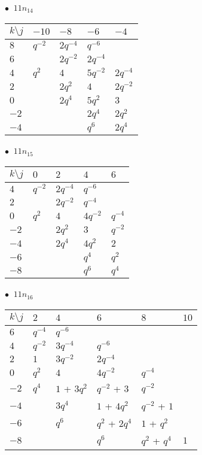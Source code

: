 %
\begin{minipage}{\linewidth}
$\bullet\ $ $11n_{14}$ \vspace{0.5em} \\
\begin{tabular}{l|llll}
$k \setminus j$ & $-10$ & $-8$ & $-6$ & $-4$ \\
\hline
$8$ & $q^{-2}$ & $2q^{-4}$ & $q^{-6}$ &  \\
$6$ &  & $2q^{-2}$ & $2q^{-4}$ &  \\
$4$ & $q^{2}$ & $4$ & $5q^{-2}$ & $2q^{-4}$ \\
$2$ &  & $2q^{2}$ & $4$ & $2q^{-2}$ \\
$0$ &  & $2q^{4}$ & $5q^{2}$ & $3$ \\
$-2$ &  &  & $2q^{4}$ & $2q^{2}$ \\
$-4$ &  &  & $q^{6}$ & $2q^{4}$ \\
\end{tabular}
\vspace{2em}
\end{minipage}
%
\begin{minipage}{\linewidth}
$\bullet\ $ $11n_{15}$ \vspace{0.5em} \\
\begin{tabular}{l|llll}
$k \setminus j$ & $0$ & $2$ & $4$ & $6$ \\
\hline
$4$ & $q^{-2}$ & $2q^{-4}$ & $q^{-6}$ &  \\
$2$ &  & $2q^{-2}$ & $q^{-4}$ &  \\
$0$ & $q^{2}$ & $4$ & $4q^{-2}$ & $q^{-4}$ \\
$-2$ &  & $2q^{2}$ & $3$ & $q^{-2}$ \\
$-4$ &  & $2q^{4}$ & $4q^{2}$ & $2$ \\
$-6$ &  &  & $q^{4}$ & $q^{2}$ \\
$-8$ &  &  & $q^{6}$ & $q^{4}$ \\
\end{tabular}
\vspace{2em}
\end{minipage}
%
\begin{minipage}{\linewidth}
$\bullet\ $ $11n_{16}$ \vspace{0.5em} \\
\begin{tabular}{l|lllll}
$k \setminus j$ & $2$ & $4$ & $6$ & $8$ & $10$ \\
\hline
$6$ & $q^{-4}$ & $q^{-6}$ &  &  &  \\
$4$ & $q^{-2}$ & $3q^{-4}$ & $q^{-6}$ &  &  \\
$2$ & $1$ & $3q^{-2}$ & $2q^{-4}$ &  &  \\
$0$ & $q^{2}$ & $4$ & $4q^{-2}$ & $q^{-4}$ &  \\
$-2$ & $q^{4}$ & $1$ + $3q^{2}$ & $q^{-2}$ + $3$ & $q^{-2}$ &  \\
$-4$ &  & $3q^{4}$ & $1$ + $4q^{2}$ & $q^{-2}$ + $1$ &  \\
$-6$ &  & $q^{6}$ & $q^{2}$ + $2q^{4}$ & $1$ + $q^{2}$ &  \\
$-8$ &  &  & $q^{6}$ & $q^{2}$ + $q^{4}$ & $1$ \\
\end{tabular}
\vspace{2em}
\end{minipage}
